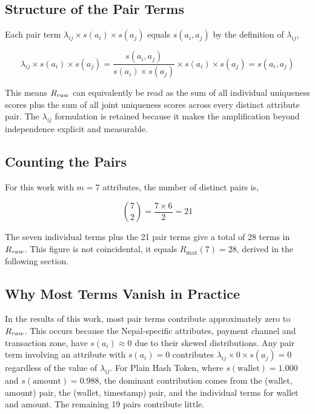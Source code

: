 \subsection{Structure of the Pair Terms}

Each pair term $\lambda_{ij} \times s(a_i) \times s(a_j)$
equals $s(a_i, a_j)$ by the definition of $\lambda_{ij}$,

\begin{equation}
\lambda_{ij} \times s(a_i) \times s(a_j)
= \frac{s(a_i, a_j)}{s(a_i) \times s(a_j)}
\times s(a_i) \times s(a_j)
= s(a_i, a_j)
\label{eq:pair_term}
\end{equation}

This means $R_{raw}$ can equivalently be read as the sum of
all individual uniqueness scores plus the sum of all joint
uniqueness scores across every distinct attribute pair.
The $\lambda_{ij}$ formulation is retained because it
makes the amplification beyond independence explicit and
measurable.

\subsection{Counting the Pairs}

For this work with $m = 7$ attributes, the number of
distinct pairs is,

\begin{equation}
\binom{7}{2} = \frac{7 \times 6}{2} = 21
\end{equation}

The seven individual terms plus the 21 pair terms give
a total of 28 terms in $R_{raw}$. This figure is not
coincidental, it equals $R_{\mathrm{max}}(7) = 28$,
derived in the following section.

\subsection{Why Most Terms Vanish in Practice}

In the results of this work, most pair terms contribute
approximately zero to $R_{raw}$. This occurs because the
Nepal-specific attributes, payment channel and
transaction zone, have $s(a_i) \approx 0$ due to
their skewed distributions. Any pair term involving an
attribute with $s(a_i) = 0$ contributes
$\lambda_{ij} \times 0 \times s(a_j) = 0$ regardless
of the value of $\lambda_{ij}$. For Plain Hash Token,
where $s(\text{wallet}) = 1.000$ and
$s(\text{amount}) = 0.988$, the dominant contribution
comes from the (wallet, amount) pair, the (wallet,
timestamp) pair, and the individual terms for wallet
and amount. The remaining 19 pairs contribute little.

